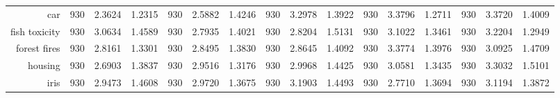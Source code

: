 \begin{table}[htbp]
{\begin{tabular}{rccccccccccccccc}
			car                                 & 930                                  & \cellcolor[rgb]{ .776,  .937,  .808}\textcolor[rgb]{ 0,  .38,  0}{2.3624}          & 1.2315          & 930            & 2.5882                                                                    & 1.4246          & 930            & 3.2978                                                                    & 1.3922          & 930            & 3.3796                                                                    & 1.2711          & 930            & 3.3720          & 1.4009          \\
			fish toxicity                       & 930                                  & 3.0634                                                                             & 1.4589          & 930            & \cellcolor[rgb]{ .776,  .937,  .808}\textcolor[rgb]{ 0,  .38,  0}{2.7935} & 1.4021          & 930            & 2.8204                                                                    & 1.5131          & 930            & 3.1022                                                                    & 1.3461          & 930            & 3.2204          & 1.2949          \\
			forest fires                        & 930                                  & \cellcolor[rgb]{ .776,  .937,  .808}\textcolor[rgb]{ 0,  .38,  0}{2.8161}          & 1.3301          & 930            & 2.8495                                                                    & 1.3830          & 930            & 2.8645                                                                    & 1.4092          & 930            & 3.3774                                                                    & 1.3976          & 930            & 3.0925          & 1.4709          \\
			housing                             & 930                                  & \cellcolor[rgb]{ .776,  .937,  .808}\textcolor[rgb]{ 0,  .38,  0}{2.6903}          & 1.3837          & 930            & 2.9516                                                                    & 1.3176          & 930            & 2.9968                                                                    & 1.4425          & 930            & 3.0581                                                                    & 1.3435          & 930            & 3.3032          & 1.5101          \\
			iris                                & 930                                  & 2.9473                                                                             & 1.4608          & 930            & 2.9720                                                                    & 1.3675          & 930            & 3.1903                                                                    & 1.4493          & 930            & \cellcolor[rgb]{ .776,  .937,  .808}\textcolor[rgb]{ 0,  .38,  0}{2.7710} & 1.3694          & 930            & 3.1194          & 1.3872          \\

\end{tabular}}
\end{table}

